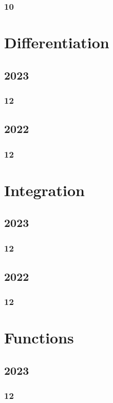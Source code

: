 \documentclass[11pt]{book}
\begin{document}
\subsection{10}



\chapter{Differentiation}
\section{2023}
\subsection{12}


\section{2022}
\subsection{12}



\chapter{Integration}
\section{2023}
\subsection{12}

\section{2022}
\subsection{12}

\chapter{Functions}
\section{2023}
\subsection{12}

\end{document}
